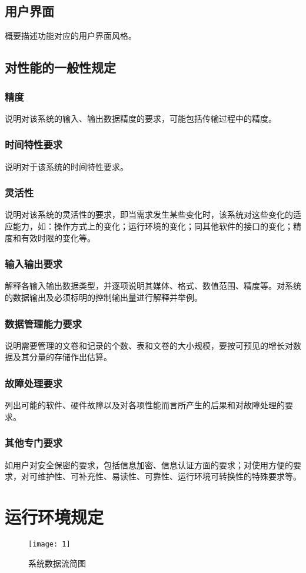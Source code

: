 \documentclass[a4paper]{ctexart}%
\begin{document}
	\subsection{用户界面}
	概要描述功能对应的用户界面风格。
	\subsection{对性能的一般性规定}	
	\subsubsection{精度}  
	说明对该系统的输入、输出数据精度的要求，可能包括传输过程中的精度。
	\subsubsection{时间特性要求} 
	说明对于该系统的时间特性要求。  
	\subsubsection{灵活性}  
	说明对该系统的灵活性的要求，即当需求发生某些变化时，该系统对这些变化的适应能力，如：操作方式上的变化；运行环境的变化；同其他软件的接口的变化；精度和有效时限的变化等。 
	\subsubsection{输入输出要求}
	解释各输入输出数据类型，并逐项说明其媒体、格式、数值范围、精度等。对系统的数据输出及必须标明的控制输出量进行解释并举例。  
	\subsubsection{数据管理能力要求}  
	说明需要管理的文卷和记录的个数、表和文卷的大小规模，要按可预见的增长对数据及其分量的存储作出估算。  
	\subsubsection{故障处理要求}
	列出可能的软件、硬件故障以及对各项性能而言所产生的后果和对故障处理的要求。  
	\subsubsection{其他专门要求}
	如用户对安全保密的要求，包括信息加密、信息认证方面的要求；对使用方便的要求，对可维护性、可补充性、易读性、可靠性、运行环境可转换性的特殊要求等。
	
	\section{运行环境规定}
	\begin{figure}[h]
		\centering
		\texttt{[image: 1]}
		\caption{系统数据流简图}
	\end{figure}
\end{document}
